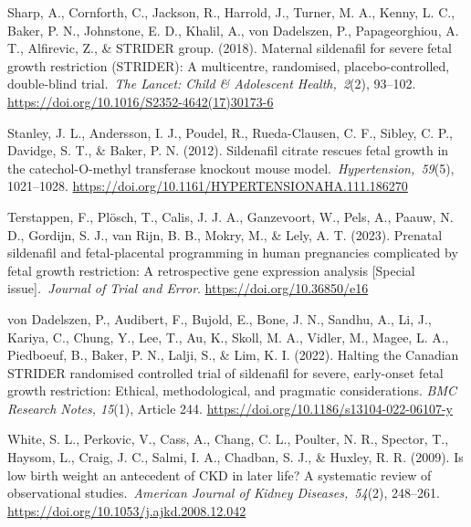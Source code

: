 \documentclass[authordate, reflection,issue]{jote-new-article}
\begin{document}
	Sharp, A., Cornforth, C., Jackson, R., Harrold, J., Turner, M. A., Kenny, L. C., Baker, P. N., Johnstone, E. D., Khalil, A., von Dadelszen, P., Papageorghiou, A. T., Alfirevic, Z., \& STRIDER group. (2018). Maternal sildenafil for severe fetal growth restriction (STRIDER): A multicentre, randomised, placebo-controlled, double-blind trial. \emph{The Lancet: Child \& Adolescent Health, 2}(2), 93--102. \url{https://doi.org/10.1016/S2352-4642(17)30173-6}



	Stanley, J. L., Andersson, I. J., Poudel, R., Rueda-Clausen, C. F., Sibley, C. P., Davidge, S. T., \& Baker, P. N. (2012). Sildenafil citrate rescues fetal growth in the catechol-O-methyl transferase knockout mouse model. \emph{Hypertension, 59}(5), 1021--1028. \url{https://doi.org/10.1161/HYPERTENSIONAHA.111.186270}







	Terstappen, F., Plösch, T., Calis, J. J. A., Ganzevoort, W., Pels, A., Paauw, N. D., Gordijn, S. J., van Rijn, B. B., Mokry, M., \& Lely, A. T. (2023). Prenatal sildenafil and fetal-placental programming in human pregnancies complicated by fetal growth restriction: A retrospective gene expression analysis [Special issue]\emph{. Journal of Trial and Error}. \url{https://doi.org/10.36850/e16}







	von Dadelszen, P., Audibert, F., Bujold, E., Bone, J. N., Sandhu, A., Li, J., Kariya, C., Chung, Y., Lee, T., Au, K., Skoll, M. A., Vidler, M., Magee, L. A., Piedboeuf, B., Baker, P. N., Lalji, S., \& Lim, K. I. (2022). Halting the Canadian STRIDER randomised controlled trial of sildenafil for severe, early-onset fetal growth restriction: Ethical, methodological, and pragmatic considerations. \emph{BMC Research Notes, 15}(1), Article 244. \url{https://doi.org/10.1186/s13104-022-06107-y}







	White, S. L., Perkovic, V., Cass, A., Chang, C. L., Poulter, N. R., Spector, T., Haysom, L., Craig, J. C., Salmi, I. A., Chadban, S. J., \& Huxley, R. R. (2009). Is low birth weight an antecedent of CKD in later life? A systematic review of observational studies. \emph{American Journal of Kidney Diseases, 54}(2), 248--261. \url{https://doi.org/10.1053/j.ajkd.2008.12.042}
\end{document}
